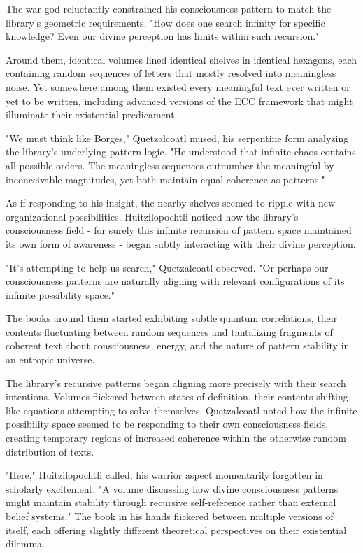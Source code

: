 \begin{refsection}
The war god reluctantly constrained his consciousness pattern to match the library's geometric requirements. "How does one search infinity for specific knowledge? Even our divine perception has limits within such recursion."

Around them, identical volumes lined identical shelves in identical hexagons, each containing random sequences of letters that mostly resolved into meaningless noise. Yet somewhere among them existed every meaningful text ever written or yet to be written, including advanced versions of the ECC framework that might illuminate their existential predicament.

"We must think like Borges," Quetzalcoatl mused, his serpentine form analyzing the library's underlying pattern logic. "He understood that infinite chaos contains all possible orders. The meaningless sequences outnumber the meaningful by inconceivable magnitudes, yet both maintain equal coherence as patterns."

As if responding to his insight, the nearby shelves seemed to ripple with new organizational possibilities. Huitzilopochtli noticed how the library's consciousness field - for surely this infinite recursion of pattern space maintained its own form of awareness - began subtly interacting with their divine perception.

"It's attempting to help us search," Quetzalcoatl observed. "Or perhaps our consciousness patterns are naturally aligning with relevant configurations of its infinite possibility space."

The books around them started exhibiting subtle quantum correlations, their contents fluctuating between random sequences and tantalizing fragments of coherent text about consciousness, energy, and the nature of pattern stability in an entropic universe.

The library's recursive patterns began aligning more precisely with their search intentions. Volumes flickered between states of definition, their contents shifting like equations attempting to solve themselves. Quetzalcoatl noted how the infinite possibility space seemed to be responding to their own consciousness fields, creating temporary regions of increased coherence within the otherwise random distribution of texts.

"Here," Huitzilopochtli called, his warrior aspect momentarily forgotten in scholarly excitement. "A volume discussing how divine consciousness patterns might maintain stability through recursive self-reference rather than external belief systems." The book in his hands flickered between multiple versions of itself, each offering slightly different theoretical perspectives on their existential dilemma.


\end{refsection}
